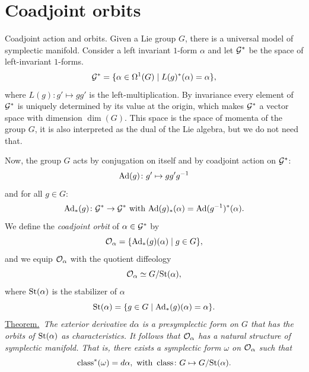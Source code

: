 \section{Coadjoint orbits}

\begin{Article}{Coadjoint action and orbits.}
  Given a Lie group $G$,
  there is a universal model of symplectic manifold.
  Consider a left invariant $1$-form $\alpha$ and let $\mathcal{G}^*$ be the space of left-invariant $1$-forms.
  $$%
    \cG^* = \{ \alpha \in \DForms^1(G) \mid L(g)^*(\alpha) = \alpha \},
    $$%
  where $L(g) \colon g' \mapsto gg'$ is the left-multiplication.
  By invariance every element of $\mathcal{G}^*$ is uniquely determined by its value at the origin,
  which makes $\mathcal{G}^*$ a vector space with dimension $\dim(G)$.
  This space is the space of momenta of the group $G$,
  it is also interpreted as the dual of the Lie algebra,
  but we do not need that.
  
  Now,
  the group $G$ acts by conjugation on itself and by coadjoint action on $\mathcal{G}^*$:
  $$%
    \Ad(g) \colon g' \mapsto gg'g^{-1}
    $$%
  and for all $g \in G$:
  $$%
    \Ad_*(g) \colon \cG^* \to \cG^*
    \SpacedText{with} \Ad(g)_*(\alpha) = \Ad(g^{-1})^*(\alpha).
    $$%
  We define the \emph{coadjoint orbit} of $\alpha \in \mathcal{G}^*$ by
  $$%
    \cO_\alpha = \{ \Ad_*(g)(\alpha) \mid g \in G \},
    $$%
  and we equip $\mathcal{O}_\alpha$ with the quotient diffeology
  $$%
    \cO_\alpha \simeq G/ \Stab(\alpha),
    $$%
  where $\mathrm{St}(\alpha)$ is the stabilizer of $\alpha$
  $$%
    \Stab(\alpha) = \{ g \in G \mid \Ad_*(g)(\alpha) = \alpha \}.
    $$%
  \uline{Theorem.}~{\itshape The exterior derivative $d\alpha$ is a presymplectic form on $G$ that has the orbits of $\mathrm{St}(\alpha)$ as characteristics.
  It follows that $\mathcal{O}_\alpha$ has a natural structure of symplectic manifold.
  That is,
  there exists a symplectic form $\omega$ on $\mathcal{O}_\alpha$ such that
  $$%
    \Class^*(\omega) = d\alpha,
    \SpacedText{with} \Class \colon G \mapsto G/\Stab(\alpha).
    $$%
  }
\end{Article}

